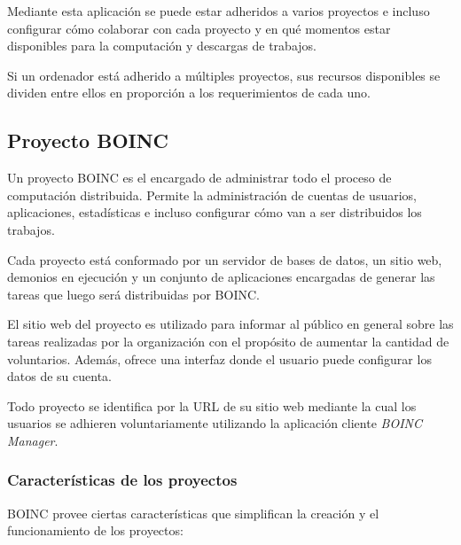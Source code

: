 Mediante esta aplicación se puede estar adheridos a varios proyectos e incluso configurar cómo colaborar con cada proyecto y en qué momentos estar disponibles para la computación y descargas de trabajos.

Si un ordenador está adherido a múltiples proyectos, sus recursos disponibles se dividen entre ellos en proporción a los requerimientos de cada uno.

\subsection{Proyecto BOINC}

Un proyecto BOINC es el encargado de administrar todo el proceso de computación distribuida. Permite la administración de cuentas de usuarios, aplicaciones, estadísticas e incluso configurar cómo van a ser distribuidos los trabajos.

Cada proyecto está conformado por un servidor de bases de datos, un sitio web, demonios en ejecución y un conjunto de aplicaciones encargadas de generar las tareas que luego será distribuidas por BOINC. 

El sitio web del proyecto es utilizado para informar al público en general sobre las tareas realizadas por la organización con el propósito de aumentar la cantidad de voluntarios. Además, ofrece una interfaz donde el usuario puede configurar los datos de su cuenta.

Todo proyecto se identifica por la URL de su sitio web mediante la cual los usuarios se adhieren voluntariamente utilizando la aplicación cliente \textit{BOINC Manager}. 

\subsubsection{Características de los proyectos}

BOINC provee ciertas características que simplifican la creación y  el funcionamiento de los proyectos:

